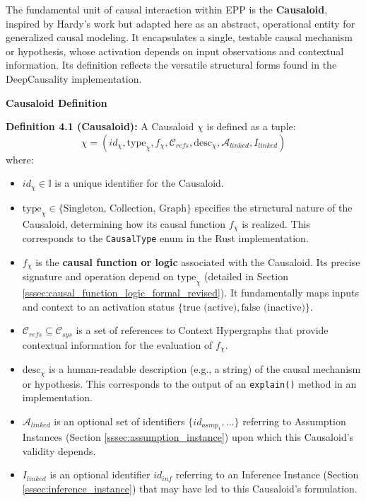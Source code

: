 The fundamental unit of causal interaction within EPP is the \textbf{Causaloid}, inspired by Hardy's work \cite{HardyDynamicCausalStructure} but adapted here as an abstract, operational entity for generalized causal modeling. It encapsulates a single, testable causal mechanism or hypothesis, whose activation depends on input observations and contextual information. Its definition reflects the versatile structural forms found in the DeepCausality implementation.

\textbf{Causaloid Definition}


\textbf{Definition 4.1 (Causaloid):} A Causaloid \( \chi \) is defined as a tuple:
\[ \chi = (id_\chi, \text{type}_\chi, f_\chi, \mathcal{C}_{refs}, \text{desc}_\chi, \mathcal{A}_{linked}, I_{linked}) \]
where:
\begin{itemize}
    \item \( id_\chi \in \mathbb{I} \) is a unique identifier for the Causaloid.
    \item \( \text{type}_\chi \in \{\text{Singleton, Collection, Graph}\} \) specifies the structural nature of the Causaloid, determining how its causal function \(f_\chi\) is realized. This corresponds to the \texttt{CausalType} enum in the Rust implementation.
    \item \( f_\chi \) is the \textbf{causal function or logic} associated with the Causaloid. Its precise signature and operation depend on \(\text{type}_\chi\) (detailed in Section \ref{sssec:causal_function_logic_formal_revised}). It fundamentally maps inputs and context to an activation status \(\{\text{true (active)}, \text{false (inactive)}\}\).
    \item \( \mathcal{C}_{refs} \subseteq \mathcal{C}_{sys} \) is a set of references to Context Hypergraphs that provide contextual information for the evaluation of \(f_\chi\).
    \item \( \text{desc}_\chi \) is a human-readable description (e.g., a string) of the causal mechanism or hypothesis. This corresponds to the output of an \texttt{explain()} method in an implementation.
    \item \( \mathcal{A}_{linked} \) is an optional set of identifiers \(\{id_{asmp_1}, \dots\}\) referring to Assumption Instances (Section \ref{sssec:assumption_instance}) upon which this Causaloid's validity depends.
    \item \( I_{linked} \) is an optional identifier \(id_{inf}\) referring to an Inference Instance (Section \ref{sssec:inference_instance}) that may have led to this Causaloid's formulation.
\end{itemize}


